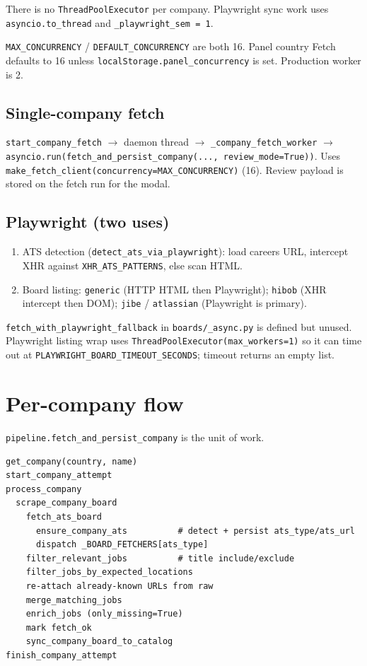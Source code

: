 \documentclass[11pt,a4paper]{article}
\begin{document}
There is no \texttt{ThreadPoolExecutor} per company. Playwright sync work uses
\texttt{asyncio.to\_thread} and \texttt{\_playwright\_sem = 1}.

\texttt{MAX\_CONCURRENCY} / \texttt{DEFAULT\_CONCURRENCY} are both 16. Panel
country Fetch defaults to 16 unless \texttt{localStorage.panel\_concurrency}
is set. Production worker is 2.

\subsection{Single-company fetch}

\texttt{start\_company\_fetch} $\rightarrow$ daemon thread $\rightarrow$
\texttt{\_company\_fetch\_worker} $\rightarrow$
\texttt{asyncio.run(fetch\_and\_persist\_company(..., review\_mode=True))}.
Uses \texttt{make\_fetch\_client(concurrency=MAX\_CONCURRENCY)} (16). Review
payload is stored on the fetch run for the modal.

\subsection{Playwright (two uses)}

\begin{enumerate}
  \item ATS detection (\texttt{detect\_ats\_via\_playwright}): load careers URL,
        intercept XHR against \texttt{XHR\_ATS\_PATTERNS}, else scan HTML.
  \item Board listing: \texttt{generic} (HTTP HTML then Playwright);
        \texttt{hibob} (XHR intercept then DOM); \texttt{jibe} / \texttt{atlassian}
        (Playwright is primary).
\end{enumerate}

\texttt{fetch\_with\_playwright\_fallback} in \texttt{boards/\_async.py} is
defined but unused. Playwright listing wrap uses
\texttt{ThreadPoolExecutor(max\_workers=1)} so it can time out at
\texttt{PLAYWRIGHT\_BOARD\_TIMEOUT\_SECONDS}; timeout returns an empty list.

\section{Per-company flow}

\texttt{pipeline.fetch\_and\_persist\_company} is the unit of work.

\begin{lstlisting}
get_company(country, name)
start_company_attempt
process_company
  scrape_company_board
    fetch_ats_board
      ensure_company_ats          # detect + persist ats_type/ats_url
      dispatch _BOARD_FETCHERS[ats_type]
    filter_relevant_jobs          # title include/exclude
    filter_jobs_by_expected_locations
    re-attach already-known URLs from raw
    merge_matching_jobs
    enrich_jobs (only_missing=True)
    mark fetch_ok
    sync_company_board_to_catalog
finish_company_attempt
\end{lstlisting}
\end{document}
